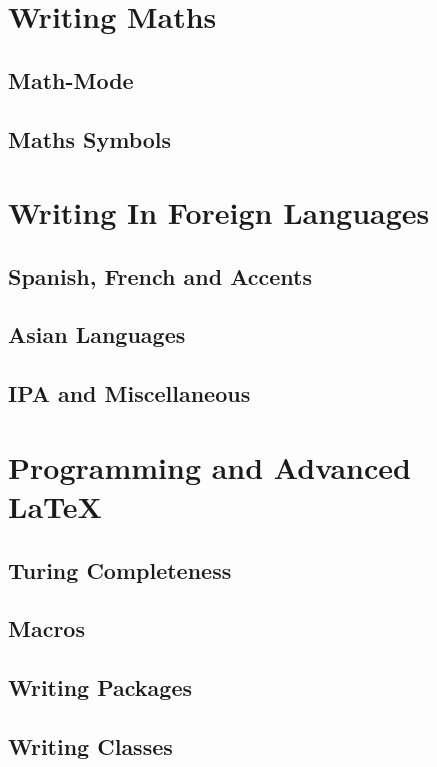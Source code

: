 \documentclass[12pt,a4paper]{article}
\begin{document}
\newpage
\section{Writing Maths}

\subsection{Math-Mode}

\subsection{Maths Symbols}

\newpage
\section{Writing In Foreign Languages}

\subsection{Spanish, French and Accents}

\subsection{Asian Languages}

\subsection{IPA and Miscellaneous}

\newpage
\section{Programming and Advanced LaTeX}

\subsection{Turing Completeness}

\subsection{Macros}

\subsection{Writing Packages}

\subsection{Writing Classes}

\newpage

\end{document}
